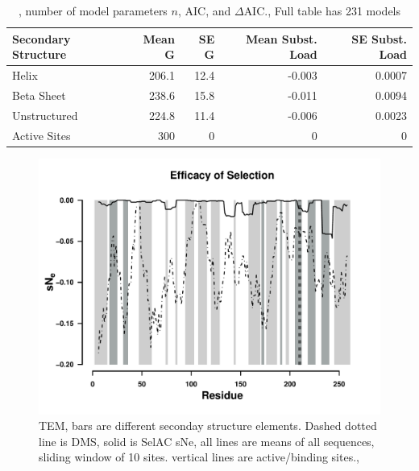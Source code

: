 \documentclass[12pt]{article}
\begin{document}
\begin{table}
  \centering
  \begin{tabular}{lrrrr}
    Secondary Structure	& Mean G & SE G & Mean Subst. Load & SE Subst. Load \\ \hline 
    Helix		& 206.1 & 12.4 & -0.003 & 0.0007 \\
    Beta Sheet 		& 238.6 & 15.8 & -0.011 & 0.0094 \\
    Unstructured	& 224.8 & 11.4 & -0.006 & 0.0023 \\
    Active Sites	& 300   & 0    & 0      & 0      \\
  \end{tabular}
  \caption{\LLik, number of model parameters $n$, AIC, and $\Delta$AIC., Full table has 231 models}
  \label{tab:selection}
\end{table}

\begin{figure}[H]
     \centering
	\includegraphics[width=\textwidth]{img/sNe_slide_TEM2016}
	\caption{TEM, bars are different seconday structure elements. Dashed dotted line is DMS, solid is SelAC sNe, all lines are means of all sequences, sliding window of 10 sites. vertical lines are active/binding sites.,}
	\label{fig:tem2016_sse}
\end{figure}
\end{document}
